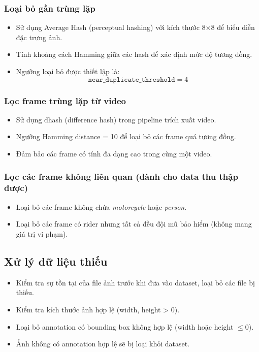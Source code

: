 \subsubsection{Loại bỏ gần trùng lặp}

\begin{itemize}
    \item Sử dụng Average Hash (perceptual hashing) với kích thước 8×8 để biểu diễn đặc trưng ảnh.
    \item Tính khoảng cách Hamming giữa các hash để xác định mức độ tương đồng.
    \item Ngưỡng loại bỏ được thiết lập là:
    \[
        \texttt{near\_duplicate\_threshold} = 4
    \]
\end{itemize}

\subsubsection{Lọc frame trùng lặp từ video}

\begin{itemize}
    \item Sử dụng dhash (difference hash) trong pipeline trích xuất video.
    \item Ngưỡng Hamming distance = 10 để loại bỏ các frame quá tương đồng.
    \item Đảm bảo các frame có tính đa dạng cao trong cùng một video.
\end{itemize}

\subsubsection{Lọc các frame không liên quan (dành cho data thu thập được)}

\begin{itemize}
    \item Loại bỏ các frame không chứa \textit{motorcycle} hoặc \textit{person}.
    \item Loại bỏ các frame có rider nhưng tất cả đều đội mũ bảo hiểm (không mang giá trị vi phạm).
\end{itemize}

\subsection{Xử lý dữ liệu thiếu}

\begin{itemize}
    \item Kiểm tra sự tồn tại của file ảnh trước khi đưa vào dataset, loại bỏ các file bị thiếu.
    \item Kiểm tra kích thước ảnh hợp lệ (width, height > 0).
    \item Loại bỏ annotation có bounding box không hợp lệ (width hoặc height $\leq 0$).
    \item Ảnh không có annotation hợp lệ sẽ bị loại khỏi dataset.
\end{itemize}

